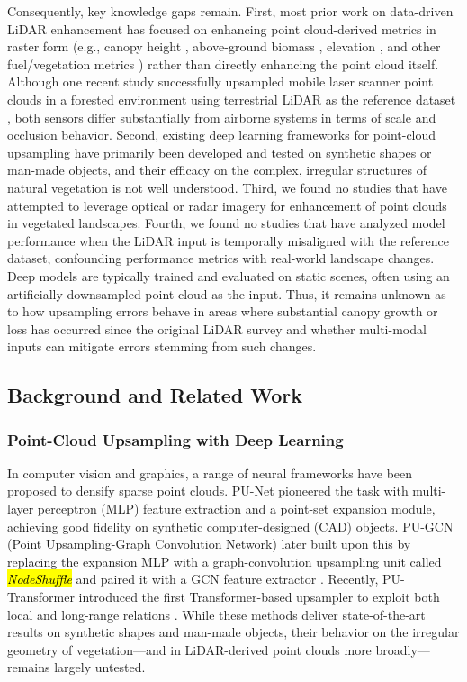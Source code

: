 \documentclass[remotesensing,article,accept,pdftex,moreauthors]{Definitions/mdpi}
\begin{document}
Consequently, key knowledge gaps remain. First, most prior work on data-driven LiDAR enhancement has focused on enhancing point cloud-derived metrics in raster form (e.g., canopy height \cite{wilkes_mapping_2015, wagner_sub-meter_2024}, above-ground biomass \cite{shendryk2022fusing}, elevation \cite{li2023large}, and other fuel/vegetation metrics \cite{taneja2023up, gazzea2023high}) rather than directly enhancing the point cloud itself. Although one recent study successfully upsampled mobile laser scanner point clouds in a forested environment using terrestrial LiDAR as the reference dataset \cite{remijnse2024upsampling}, both sensors differ substantially from airborne systems in terms of scale and occlusion behavior. Second, existing deep learning frameworks for point-cloud upsampling have primarily been developed and tested on synthetic shapes or man-made objects, and their efficacy on the complex, irregular structures of natural vegetation is not well understood. Third, we found no studies that have attempted to leverage optical or radar imagery for enhancement of point clouds in vegetated landscapes. Fourth, we found no studies that have analyzed model performance when the LiDAR input is temporally misaligned with the reference dataset, confounding performance metrics with real-world landscape changes. Deep models are typically trained and evaluated on static scenes, often using an artificially downsampled point cloud as the input. Thus, it remains unknown as to how upsampling errors behave in areas where substantial canopy growth or loss has occurred since the original LiDAR survey and whether multi-modal inputs can mitigate errors stemming from such changes.

\subsection{Background and Related Work}

\subsubsection{Point-Cloud Upsampling with Deep Learning}

In computer vision and graphics, a range of neural frameworks have been proposed to densify sparse point clouds. PU-Net \cite{yu2018pu} pioneered the task with multi-layer perceptron (MLP) feature extraction and a point-set expansion module, achieving good fidelity on synthetic computer-designed (CAD) objects. PU-GCN (Point Upsampling-Graph Convolution Network) later built upon this by replacing the expansion MLP with a graph-convolution upsampling unit called \emph{\hl{NodeShuffle}%
} and paired it with a GCN feature extractor \cite{qian2021pu}. Recently, PU-Transformer introduced the first Transformer-based upsampler to exploit both local and long-range relations \cite{qiu2022pu}. While these methods deliver state-of-the-art results on synthetic shapes and man-made objects, their behavior on the irregular geometry of vegetation—and in LiDAR-derived point clouds more broadly—remains largely untested.
\end{document}
